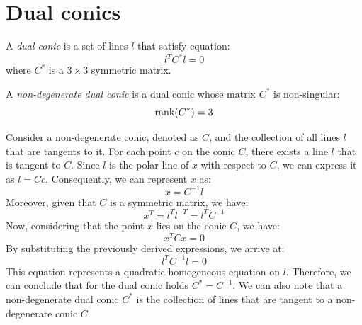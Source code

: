 \section{Dual conics}

\begin{definition}
    A \emph{dual conic} is a set of lines $l$ that satisfy equation:
    \[l^TC^{*}l=0\]
    where $C^{*}$ is a $3 \times 3$ symmetric matrix.

    A \emph{non-degenerate dual conic} is a dual conic whose matrix $C^{*}$ is non-singular: 
    \[\textnormal{rank}(C^{*})=3\]
\end{definition}
Consider a non-degenerate conic, denoted as $C$, and the collection of all lines $l$ that are tangents to it.
For each point $c$ on the conic $C$, there exists a line $l$ that is tangent to $C$. 
Since $l$ is the polar line of $x$ with respect to $C$, we can express it as $l=Cc$.
Consequently, we can represent $x$ as:
\[x=C^{-1}l\]
Moreover, given that $C$ is a symmetric matrix, we have:
\[x^T=l^Tl^{-T}=l^TC^{-1}\]
Now, considering that the point $x$ lies on the conic $C$, we have:
\[x^TCx=0\]
By substituting the previously derived expressions, we arrive at:
\[l^TC^{-1}l=0\]
This equation represents a quadratic homogeneous equation on $l$. 
Therefore, we can conclude that for the dual conic holds $C^{*}=C^{-1}$. 
We can also note that a non-degenerate dual conic $C^{*}$ is the collection of lines that are tangent to a non-degenerate conic $C$.

